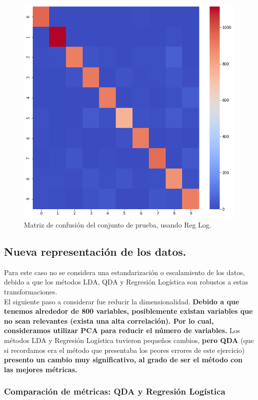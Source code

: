 \documentclass[paper=letter, fontsize=11pt]{scrartcl}
\numberwithin{equation}{section} %
\numberwithin{figure}{section} %
\numberwithin{table}{section} %
\begin{document}
\begin{figure}[!htb]
  \includegraphics[width=\linewidth]{figure/log_reg2_confusion.png}
\endminipage
\caption{Matriz de confusión del conjunto de prueba, usando Reg Log.}
\label{fig:log_reg_confusion}
\end{figure}

\subsection{Nueva representación de los datos.}
Para este caso no se considera una estandarización o escalamiento de los datos, debido a que los métodos LDA, QDA y Regresión Logística son robustos a estas transformaciones.\\

El siguiente paso a considerar fue reducir la dimensionalidad. \textbf{Debido a que tenemos alrededor de 800 variables, posiblemente existan variables que no sean relevantes (exista una alta correlación). Por lo cual, consideramos utilizar PCA para reducir el número de variables.} Los métodos LDA y Regresión Logística tuvieron pequeños cambios, \textbf{pero QDA} (que si recordamos era el método que presentaba los peores errores de este ejercicio) \textbf{presento un cambio muy significativo, al grado de ser el método con las mejores métricas. }

\subsubsection{Comparación de métricas: QDA y Regresión Logística}
\end{document}
